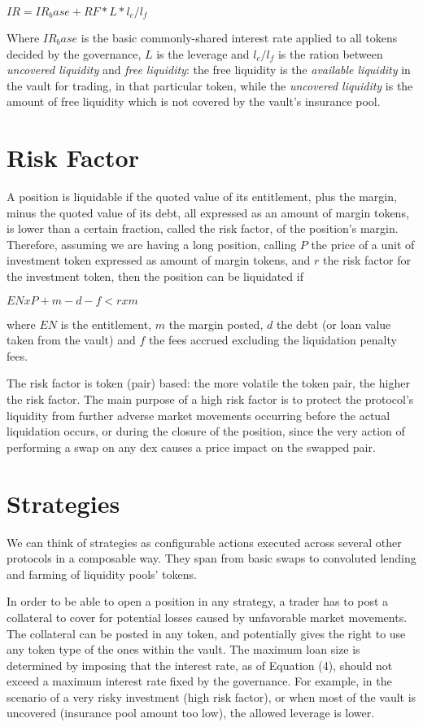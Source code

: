 \documentclass[a4paper,10 pt]{article}
\theoremstyle{definition}
\begin{document}
$IR = IR_base + RF * L * l_c/l_f$

Where $IR_base$ is the basic commonly-shared interest rate applied to all tokens decided by the governance, $L$ is the leverage and $l_c/l_f$ is the ration between {\it uncovered liquidity} and {\it free liquidity}: the free liquidity is the {\it available liquidity} in the vault for trading, in that particular token, while the {\it uncovered liquidity} is the amount of free liquidity which is not covered by the vault's insurance pool.

\section{Risk Factor}
A position is liquidable if the quoted value of its entitlement, plus the margin, minus the quoted value of its debt, all expressed as an amount of margin tokens, is lower than a certain fraction, called the risk factor,
of the position's margin. Therefore, assuming we are having a long position, calling $P$ the price of a unit of investment token expressed as amount of margin tokens, and $r$ the risk factor for the investment token, then the position can be liquidated if 

$EN x P + m - d - f < r x m $

where $EN$ is the entitlement, $m$ the margin posted, $d$ the debt (or loan value taken from the vault) and $f$ the fees accrued excluding the liquidation penalty fees.

The risk factor is token (pair) based: the more volatile the token pair, the higher the risk factor. The main purpose of a high risk factor is to protect the protocol's liquidity from further adverse market movements occurring before the actual liquidation occurs, or during the closure of the position, since the very action of performing a swap on any dex causes a price impact on the swapped pair.


\section{Strategies}
We can think of strategies as configurable actions executed across several other protocols in a composable way. They span from basic swaps to convoluted lending and farming of liquidity pools' tokens.

In order to be able to open a position in any strategy, a trader has to post a collateral to cover for potential losses caused by unfavorable market movements. The collateral can be posted in any token, and potentially gives the right to use any token type of the ones within the vault. The maximum loan size is determined by imposing that the interest rate, as of Equation (4), should not exceed a maximum interest rate fixed by the governance. For example, in the scenario of a very risky investment (high risk factor), or when most of the vault is uncovered (insurance pool amount too low), the allowed leverage is lower.
\end{document}
